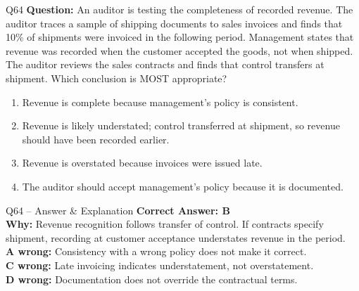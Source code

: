 \documentclass[aspectratio=169,10pt]{beamer}
\begin{document}
	\begin{frame}[t]{Q64}
		\small
		\textbf{Question:} An auditor is testing the completeness of recorded revenue. The auditor traces a sample of shipping documents to sales invoices and finds that 10\% of shipments were invoiced in the following period. Management states that revenue was recorded when the customer accepted the goods, not when shipped. The auditor reviews the sales contracts and finds that control transfers at shipment. Which conclusion is MOST appropriate?
		\begin{enumerate}[label=\Alph*.,itemsep=1pt,topsep=2pt]
			\item Revenue is complete because management's policy is consistent.
			\item Revenue is likely understated; control transferred at shipment, so revenue should have been recorded earlier.
			\item Revenue is overstated because invoices were issued late.
			\item The auditor should accept management's policy because it is documented.
		\end{enumerate}
	\end{frame}
	
	\begin{frame}[t]{Q64 -- Answer \& Explanation}
		\small
		\textbf{Correct Answer: B} \\[4pt]
		\textbf{Why:} Revenue recognition follows transfer of control. If contracts specify shipment, recording at customer acceptance understates revenue in the period. \\[4pt]
		\textbf{A wrong:} Consistency with a wrong policy does not make it correct. \\[2pt]
		\textbf{C wrong:} Late invoicing indicates understatement, not overstatement. \\[2pt]
		\textbf{D wrong:} Documentation does not override the contractual terms.
	\end{frame}
	
\end{document}

